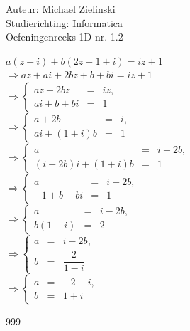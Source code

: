 \documentclass[a4paper]{article}
\begin{document}
  
\noindent \large Auteur: Michael Zielinski \\
\noindent \large Studierichting: Informatica\\
\noindent \large Oefeningenreeks 1D nr. 1.2\\

\medskip

\normalsize

$a(z + i) + b(2z + 1 + i) = iz + 1$\\

$\Rightarrow az + ai + 2bz + b + bi = iz + 1$\\

$\Rightarrow\left\{
    \begin{array}{lll}
        az + 2bz      & = & iz,\\
        ai + b + bi   & = & 1
    \end{array}
\right.$\\

$\Rightarrow\left\{
    \begin{array}{lll}
        a + 2b            & = & i,\\
        ai + (1 + i)b     & = & 1
    \end{array}
\right.$\\

$\Rightarrow\left\{
    \begin{array}{lll}
        a                & = & i - 2b,\\
        (i - 2b)i + (1 + i)b & = & 1
    \end{array}
\right.$\\

$\Rightarrow\left\{
    \begin{array}{lll}
        a                & = & i - 2b,\\
        -1 + b - bi      & = & 1
    \end{array}
\right.$\\

$\Rightarrow\left\{
    \begin{array}{lll}
        a                & = & i - 2b,\\
        b(1 - i)         & = & 2
    \end{array}
\right.$\\

$\Rightarrow\left\{
    \begin{array}{lll}
        a                & = & i - 2b,\\
        b                & = & \dfrac{2}{1 - i}
    \end{array}
\right.$\\

$\Rightarrow\left\{
    \begin{array}{lll}
        a                & = & -2 - i,\\
        b                & = & 1 + i
    \end{array}
\right.$

\begin{thebibliography}{999}
\end{thebibliography}
\end{document}

